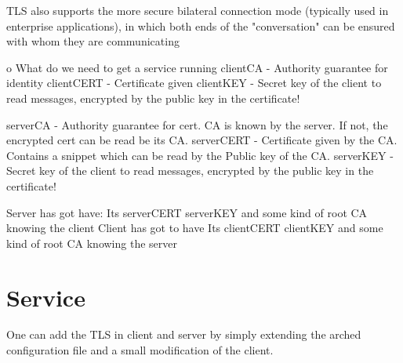 TLS also supports the more secure bilateral connection mode (typically used in enterprise applications), in which both ends of the "conversation" can be ensured with whom they are communicating




o What do we need to get a service running
clientCA   - Authority guarantee for identity
clientCERT - Certificate given
clientKEY  - Secret key of the client to read messages, encrypted by the public key in the certificate!

serverCA   - Authority guarantee for cert. CA is known by the server. If not, the encrypted cert can be read be its CA.
serverCERT - Certificate given by the CA. Contains a snippet which can be read by the Public key of the CA.
serverKEY  - Secret key of the client to read messages, encrypted by the public key in the certificate!


Server has got have:
Its  serverCERT serverKEY and some kind of root CA knowing the client
Client has got to have
Its  clientCERT clientKEY and some kind of root CA knowing the server













%
%


\clearpage
\section{Service}

One can add the TLS in client and server by simply extending the arched configuration file and a small modification of the client.



